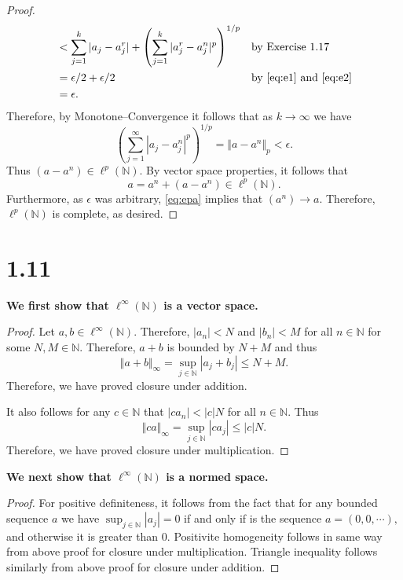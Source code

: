 \documentclass[10pt]{article}
\begin{document}
\begin{proof}
\begin{alignat*}{2}
        &< \sum_{j=1}^{k}|a_j - a^r_j| + \left ( \sum_{j=1}^{k} |a_j^r - a_j^n|^p \right )^{1/p} && \text{by Exercise 1.17}\\
        &= \epsilon/2 + \epsilon/2 &&\text{by \eqref{eq:e1} and \eqref{eq:e2}}\\
        &= \epsilon.
    \end{alignat*}
    Therefore, by Monotone--Convergence it follows that as $k\to\infty$ we have
    \begin{equation} \label{eq:epa}
        \left ( \sum_{j=1}^{\infty} |a_j - a_j^n|^p \right )^{1/p} = \Vert a - a^n \Vert_p <\epsilon.
    \end{equation}
    Thus $(a-a^n)\in\ell^p(\mathbb{N}).$ By vector space properties, it follows that
    \[a = a^n + (a-a^n)\in\ell^p(\mathbb{N}).\]
    Furthermore, as $\epsilon$ was arbitrary, \eqref{eq:epa} implies that $(a^n) \to a.$ Therefore, $\ell^p(\mathbb{N})$ is complete, as desired.
\end{proof}

\section*{1.11}


\textbf{We first show that $\ell^\infty(\mathbb{N})$ is a vector space.}

\begin{proof}
    Let $a,b \in \ell^\infty(\mathbb{N}).$ Therefore, $|a_n|<N$ and $|b_n|<M$ for all $n\in\mathbb{N}$ for some $N,M \in \mathbb{N}.$ Therefore, $a + b$ is bounded by $N+M$ and thus
    \[\Vert a+b\Vert_\infty = \sup_{j\in\mathbb{N}}|a_j + b_j| \le N+M.\]
    Therefore, we have proved closure under addition.

    It also follows for any $c \in \mathbb{N}$ that $|ca_n| < |c|N$ for all $n\in \mathbb{N}.$ Thus
    \[\Vert ca\Vert_\infty = \sup_{j\in\mathbb{N}}|ca_j| \le |c|N.\]
    Therefore, we have proved closure under multiplication.
\end{proof}

\noindent
\textbf{We next show that $\ell^\infty(\mathbb{N})$ is a normed space.}

\begin{proof}
    For positive definiteness, it follows from the fact that for any bounded sequence $a$ we have $\sup_{j\in\mathbb{N}}|a_j| = 0$ if and only if is the sequence $a = (0,0,\cdots),$ and otherwise it is greater than $0$. Positivite homogeneity follows in same way from above proof for closure under multiplication. Triangle inequality follows similarly from above proof for closure under addition.
\end{proof}
\end{document}
